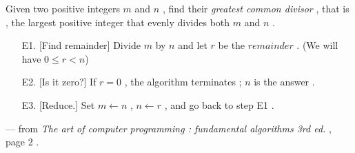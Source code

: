 \documentclass{article}
\begin{document}
Given two positive integers $ m $ and $ n $ ,
find their \emph{greatest common divisor} , that is ,
the largest positive integer that
evenly divides both $ m $ and $ n $ .

\begin{itemize}
\item [E1.] [Find remainder] Divide $ m $ by $ n$ and let $ r $ be the $ remainder $ . (We will have $ 0 \leq r < n $)
\item [E2.] [Is it zero?] If $ r = 0 $ , the algorithm terminates ; $ n $ is the answer .
\item [E3.] [Reduce.] Set $ m \leftarrow n $ , $ n \leftarrow r $ , and go back to step E1 .
\end{itemize}

--- from \textit{The art of computer programming : fundamental algorithms 3rd ed.}  , page 2 .
\end{document}
